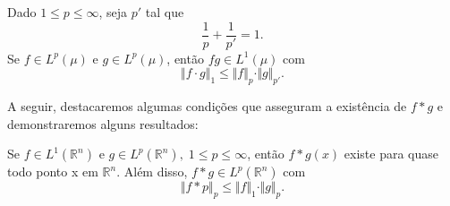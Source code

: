 \documentclass[../distribution_theory_notes.tex]{subfiles}
\begin{document}
        \begin{tcolorbox}[
        skin=enhanced,
        title=Lembrete!,
        after title={\hfill Desigualdade de Hölder},
        fonttitle=\bfseries,
        sharp corners=downhill,
      colframe=black,
        colbacktitle=yellow!75!white, 
        colback=yellow!30,
        colbacklower=black,
      coltitle=black,
        drop large lifted shadow
        ]
        \hypertarget{holder_inequality}{
          \begin{theorem*}
           Dado \(1\leq p\leq \infty\), seja \(p'\) tal que 
             \[
               \frac{1}{p}+\frac{1}{p'}=1. 
             \]
             Se \(f\in L^{p}(\mu )\) e \(g\in L^{p}(\mu )\), então \(fg\in L^{1}(\mu )\) com 
               \[
                 \Vert f \cdot g \Vert_{1}\leq \Vert f \Vert_p \cdot \Vert g \Vert_{p'}.
               \]
         \end{theorem*}
        }
        \end{tcolorbox}

      A seguir, destacaremos algumas condições que asseguram a existência de \(f*g\) e demonstraremos alguns resultados:
      \hypertarget{young_inequality}{
        \begin{theorem*}
         Se \(f\in L^{1}(\mathbb{R}^{n})\) e \(g\in L^{p}(\mathbb{R}^{n}),\; 1\leq p\leq \infty\), então \(f*g(x)\) existe para quase todo ponto x em \(\mathbb{R}^{n}\). Além disso, \(f*g\in L^{p}(\mathbb{R}^{n})\) com 
           \[
             \Vert f*p \Vert_{p}\leq \Vert f \Vert_{1} \cdot \Vert g \Vert_{p}.
           \]
       \end{theorem*}
      }
\end{document}
